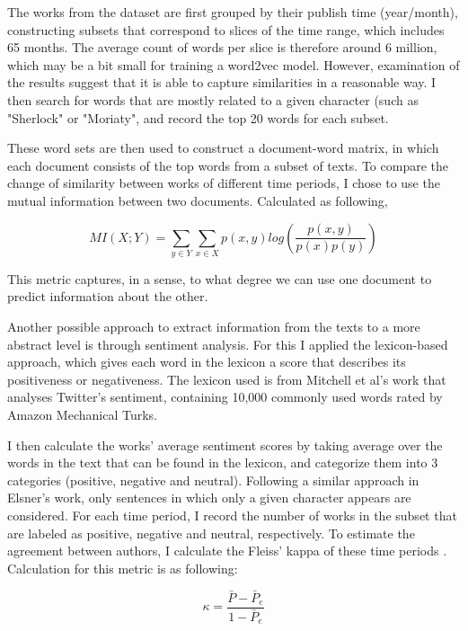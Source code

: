 \documentclass{pnastwo}
\begin{document}
\begin{article}
The works from the dataset are first grouped by their publish time (year/month), constructing subsets that correspond to slices of the time range, which includes 65 months. The average count of words per slice is therefore around 6 million, which may be a bit small for training a word2vec model. However, examination of the results suggest that it is able to capture similarities in a reasonable way. I then search for words that are mostly related to a given character (such as "Sherlock" or "Moriaty", and record the top 20 words for each subset. 

These word sets are then used to construct a document-word matrix, in which each  document consists of the top words from a subset of texts. To compare the change of similarity between works of different time periods, I chose to use the mutual information between two documents. Calculated as following, 

\begin{equation}
MI(X;Y) = \sum_{y\in Y}\sum_{x\in X} p(x, y) log(\frac{p(x,y)}{p(x)p(y)})
\end{equation}

This metric captures, in a sense, to what degree we can use one document to predict information about the other. 

Another possible approach to extract information from the texts to a more abstract level is through sentiment analysis. For this I applied the lexicon-based approach, which gives each word in the lexicon a score that describes its positiveness or negativeness. The lexicon used is from Mitchell et al's work that analyses Twitter's 
sentiment\cite{10.1371/journal.pone.0026752}, containing 10,000 commonly used words rated by Amazon Mechanical Turks. 

I then calculate the works' average sentiment scores by taking average over the words in the text that can be found in the lexicon, and categorize them into 3 categories (positive, negative and neutral). Following a similar approach in Elsner's work\cite{elsner2012character}, only sentences in which only a given character appears are considered.  For each time period, I record the number of works in the subset that are labeled as positive, negative and neutral, respectively. To estimate the agreement between authors, I calculate the Fleiss' kappa of these time periods\cite{wiki:fleisskappa} . Calculation for this metric is as following:

\begin{equation}
\kappa = \frac{\bar{P} - \bar{P}_e}{1-\bar{P}_e}
\end{equation}


\end{article}
\end{document}
